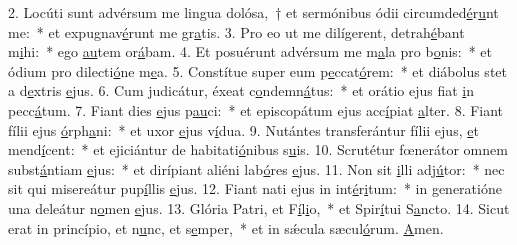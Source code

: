 2. Locúti sunt advérsum me lingua dolósa,~† et sermónibus ódii circumded\uline{é}r\uline{u}nt me:~* et expugnav\uline{é}runt me gr\uline{a}tis.
3. Pro eo ut me dilígerent, detrah\uline{é}bant m\uline{i}hi:~* ego \uline{au}tem or\uline{á}bam.
4. Et posuérunt advérsum me m\uline{a}la pro b\uline{o}nis:~* et ódium pro dilecti\uline{ó}ne m\uline{e}a.
5. Constítue super eum p\uline{e}ccat\uline{ó}rem:~* et diábolus stet a d\uline{e}xtris \uline{e}jus.
6. Cum judicátur, éxeat c\uline{o}ndemn\uline{á}tus:~* et orátio ejus fiat \uline{i}n pecc\uline{á}tum.
7. Fiant dies \uline{e}jus p\uline{au}ci:~* et episcopátum ejus acc\uline{í}piat \uline{a}lter.
8. Fiant fílii ejus \uline{ó}rph\uline{a}ni:~* et uxor \uline{e}jus v\uline{í}dua.
9. Nutántes transferántur fílii ejus, \uline{e}t mend\uline{í}cent:~* et ejiciántur de habitati\uline{ó}nibus s\uline{u}is.
10. Scrutétur fœnerátor omnem subst\uline{á}ntiam \uline{e}jus:~* et dirípiant aliéni lab\uline{ó}res \uline{e}jus.
11. Non sit \uline{i}lli adj\uline{ú}tor:~* nec sit qui misereátur pup\uline{í}llis \uline{e}jus.
12. Fiant nati ejus in int\uline{é}r\uline{i}tum:~* in generatióne una deleátur n\uline{o}men \uline{e}jus.
13. Glória Patri, et F\uline{í}l\uline{i}o,~* et Spir\uline{í}tui S\uline{a}ncto.
14. Sicut erat in princípio, et n\uline{u}nc, et s\uline{e}mper,~* et in sǽcula sæcul\uline{ó}rum. \uline{A}men.

